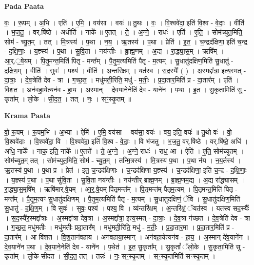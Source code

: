 \documentclass[17pt]{extarticle}
\begin{document}
\textbf{Pada Paata} \newline

वः॒ । रू॒पम् । अ॒भि । एति॑ । ए॒मि॒ । वय॑सा । वयः॑ ॥ तु॒थः । वः॒ । वि॒श्ववे॑दा॒ इति॑ वि॒श्व - वे॒दाः॒ । वीति॑ । भ॒ज॒तु॒ । वर्.षि॑ष्ठे । अधीति॑ । नाके᳚ ॥ ए॒तत् । ते॒ । अ॒ग्ने॒ । राधः॑ । एति॑ । ए॒ति॒ । सोम॑च्युत॒मिति॒ सोम॑ - च्यु॒त॒म् । तत् । मि॒त्रस्य॑ । प॒था । न॒य॒ । ऋ॒तस्य॑ । प॒था । प्रेति॑ । इ॒त॒ । च॒न्द्रद॑क्षिणा॒ इति॑ च॒न्द्र - द॒क्षि॒णाः॒ । य॒ज्ञ्स्य॑ । प॒था । सु॒वि॒ता । नय॑न्तीः । ब्रा॒ह्म॒णम् । अ॒द्य । रा॒द्ध्या॒स॒म् । ऋषि᳚म् । आ॒र्.॒षे॒यम् । पि॒तृ॒मन्त॒मिति॑ पितृ - मन्त᳚म् । पै॒तृ॒म॒त्यमिति॑ पैतृ - म॒त्यम् । सु॒धातु॑दक्षिण॒मिति॑ सु॒धातु॑ - द॒क्षि॒ण॒म् । वीति॑ । सुवः॑ । पश्य॑ । वीति॑ । अ॒न्तरि॑क्षम् । यत॑स्व । स॒द॒स्यैः᳚ ( ) । अ॒स्मद्दा᳚त्रा॒ इत्य॒स्मत् - दा॒त्राः॒ । दे॒व॒त्रेति॑ देव - त्रा । ग॒च्छ॒त॒ । मधु॑मती॒रिति॒ मधु॑ - म॒तीः॒ । प्र॒दा॒तार॒मिति॑ प्र - दा॒तार᳚म् । एति॑ । वि॒श॒त॒ । अन॑वहा॒येत्यन॑व - हा॒य॒ । अ॒स्मान् । दे॒व॒याने॒नेति॑ देव - याने॑न । प॒था । इ॒त॒ । सु॒कृता॒मिति॑ सु - कृता᳚म् । लो॒के । सी॒द॒त॒ । तत् । नः॒ । सꣳ॒॒स्कृ॒तम् ॥  \newline


\textbf{Krama Paata} \newline

वो॒ रू॒पम् । रू॒पम॒भि । अ॒भ्या । ऐमि॑ । ए॒मि॒ वय॑सा । वय॑सा॒ वयः॑ । वय॒ इति॒ वयः॑ ॥ तु॒थो वः॑ । वो॒ वि॒श्ववे॑दाः । वि॒श्ववे॑दा॒ वि । वि॒श्ववे॑दा॒ इति॑ वि॒श्व - वे॒दाः॒ । वि भ॑जतु । भ॒ज॒तु॒ वर्.षि॑ष्ठे । वर्.षि॑ष्ठे॒ अधि॑ । अधि॒ नाके᳚ । नाक॒ इति॒ नाके᳚ ॥ ए॒तत्ते᳚ । ते॒ अ॒ग्ने॒ । अ॒ग्ने॒ राधः॑ । राध॒ आ । ऐति॑ । ए॒ति॒ सोम॑च्युतम् । सोम॑च्युत॒म् तत् । सोम॑च्युत॒मिति॒ सोम॑ - च्यु॒त॒म् । तन्मि॒त्रस्य॑ । मि॒त्रस्य॑ प॒था । प॒था न॑य । न॒य॒र्तस्य॑ । ऋ॒तस्य॑ प॒था । प॒था प्र । प्रेत॑ । इ॒त॒ च॒न्द्रद॑क्षिणाः । च॒न्द्रद॑क्षिणा य॒ज्ञ्स्य॑ । च॒न्द्रद॑क्षिणा॒ इति॑ च॒न्द्र - द॒क्षि॒णाः॒ । य॒ज्ञ्स्य॑ प॒था । प॒था सु॑वि॒ता । सु॒वि॒ता नय॑न्तीः । नय॑न्तीर् ब्राह्म॒णम् । ब्रा॒ह्म॒णम॒द्य । अ॒द्य रा᳚द्ध्यासम् । रा॒द्ध्या॒स॒मृषि᳚म् । ऋषि॑मार्.षे॒यम् । आ॒र्॒.षे॒यम् पि॑तृ॒मन्त᳚म् । पि॒तृ॒मन्त॑म् पैतृम॒त्यम् । पि॒तृ॒मन्त॒मिति॑ पितृ - मन्त᳚म् । पै॒तृ॒म॒त्यꣳ सु॒धातु॑दक्षिणम् । पै॒तृ॒म॒त्यमिति॑ पैतृ - म॒त्यम् । सु॒धातु॑दक्षिणं॒ ॅवि । सु॒धातु॑दक्षिण॒मिति॑ सु॒धातु॑ - द॒क्षि॒ण॒म् । वि सुवः॑ । सुवः॒ पश्य॑ । पश्य॒ वि । व्य॑न्तरि॑क्षम् । अ॒न्तरि॑क्षं॒ ॅयत॑स्व । यत॑स्व सद॒स्यैः᳚ । स॒द॒स्यै॑र॒स्मद्दा᳚त्राः । अ॒स्मद्दा᳚त्रा देव॒त्रा । अ॒स्मद्दा᳚त्रा॒ इत्य॒स्मत् - दा॒त्राः॒ । दे॒व॒त्रा ग॑च्छत । दे॒व॒त्रेति॑ देव - त्रा । ग॒च्छ॒त॒ मधु॑मतीः । मधु॑मतीः प्रदा॒तार᳚म् । मधु॑मती॒रिति॒ मधु॑ - म॒तीः॒ । प्र॒दा॒तार॒मा । प्र॒दा॒तार॒मिति॑ प्र - दा॒तार᳚म् । आ वि॑शत । वि॒श॒तान॑वहाय । अन॑वहाया॒स्मान् । अन॑वहा॒येत्यन॑व - हा॒य॒ । अ॒स्मान् दे॑व॒याने॑न । दे॒व॒याने॑न प॒था । दे॒व॒याने॒नेति॑ देव - याने॑न । प॒थेत॑ । इ॒त॒ सु॒कृता᳚म् । सु॒कृतां᳚ ॅलो॒के । सु॒कृता॒मिति॑ सु - कृता᳚म् । लो॒के सी॑दत । सी॒द॒त॒ तत् । तन्नः॑ । नः॒ सꣳ॒॒स्कृ॒तम् । सꣳ॒॒स्कृ॒तमिति॑ सꣳस्कृ॒तम् । \newline
\end{document}
